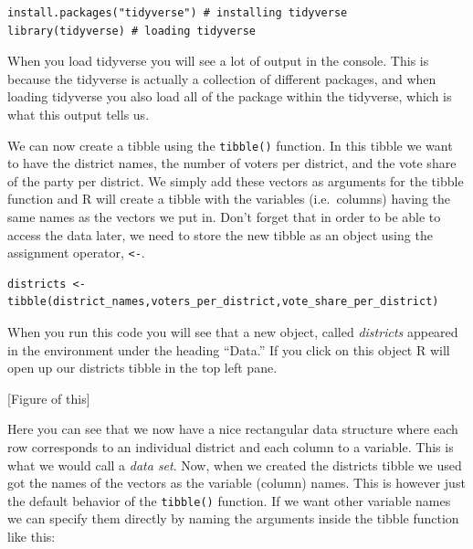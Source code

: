 \documentclass[
]{book}
\begin{document}
\begin{verbatim}
install.packages("tidyverse") # installing tidyverse
library(tidyverse) # loading tidyverse
\end{verbatim}

When you load tidyverse you will see a lot of output in the console. This is because the tidyverse is actually a collection of different packages, and when loading tidyverse you also load all of the package within the tidyverse, which is what this output tells us.


We can now create a tibble using the \texttt{tibble()} function. In this tibble we want to have the district names, the number of voters per district, and the vote share of the party per district. We simply add these vectors as arguments for the tibble function and R will create a tibble with the variables (i.e.~columns) having the same names as the vectors we put in. Don't forget that in order to be able to access the data later, we need to store the new tibble as an object using the assignment operator, \texttt{\textless{}-}.

\begin{verbatim}
districts <- tibble(district_names,voters_per_district,vote_share_per_district)
\end{verbatim}

When you run this code you will see that a new object, called \emph{districts} appeared in the environment under the heading ``Data.'' If you click on this object R will open up our districts tibble in the top left pane.

{[}Figure of this{]}

Here you can see that we now have a nice rectangular data structure where each row corresponds to an individual district and each column to a variable. This is what we would call a \emph{data set}. Now, when we created the districts tibble we used got the names of the vectors as the variable (column) names. This is however just the default behavior of the \texttt{tibble()} function. If we want other variable names we can specify them directly by naming the arguments inside the tibble function like this:
\end{document}

